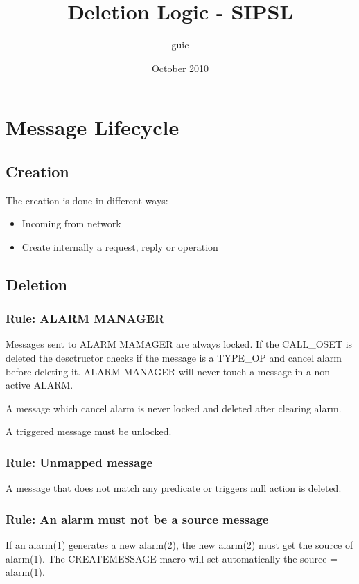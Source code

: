 \documentclass[a4paper]{article}
\title{Deletion Logic - SIPSL}
\author{guic}
\date{October 2010}
\begin{document}
	\small
	\maketitle
\section{Message Lifecycle}

\subsection{Creation}

The creation is done in different ways:

\begin{itemize}
   \item Incoming from network
   \item Create internally a request, reply or operation
\end{itemize}

\subsection{Deletion}

\subsubsection{Rule: ALARM MANAGER}
 Messages sent to ALARM MAMAGER are always locked. If the CALL_OSET is deleted the desctructor checks if the message is a TYPE\_OP and cancel alarm before deleting it.
 ALARM MANAGER will never touch a message in a non active ALARM.
 
 A message which cancel alarm is never locked and deleted after clearing alarm.
 
 A triggered message must be unlocked.
 
\subsubsection{Rule: Unmapped message}
 
A message that does not match any predicate or triggers null action is deleted.
 
\subsubsection{Rule: An alarm must not be a source message}
If an alarm(1) generates a new alarm(2), the new alarm(2) must get the source of alarm(1).
The CREATEMESSAGE macro will set automatically the source = alarm(1).
 
\end{document}
